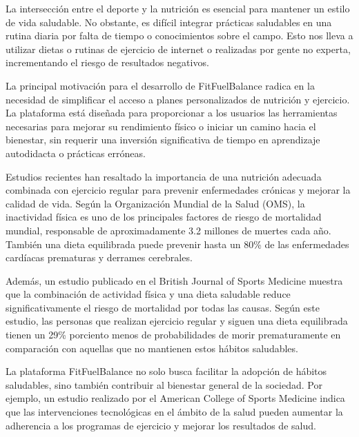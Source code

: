 La intersección entre el deporte y la nutrición es esencial para mantener un estilo de vida saludable. No obstante, es difícil integrar prácticas saludables en una rutina diaria por falta de tiempo o conocimientos sobre el campo. Esto nos lleva a utilizar dietas o rutinas de ejercicio de internet o realizadas por gente no experta, incrementando el riesgo de resultados negativos.

La principal motivación para el desarrollo de FitFuelBalance radica en la necesidad de simplificar el acceso a planes personalizados de nutrición y ejercicio. La plataforma está diseñada para proporcionar a los usuarios las herramientas necesarias para mejorar su rendimiento físico o iniciar un camino hacia el bienestar, sin requerir una inversión significativa de tiempo en aprendizaje autodidacta o prácticas erróneas.

Estudios recientes han resaltado la importancia de una nutrición adecuada combinada con ejercicio regular para prevenir enfermedades crónicas y mejorar la calidad de vida. Según la Organización Mundial de la Salud (OMS), la inactividad física es uno de los principales factores de riesgo de mortalidad mundial, responsable de aproximadamente 3.2 millones de muertes cada año\cite{WHOPhysicalActivity}. También una dieta equilibrada puede prevenir hasta un 80\% de las enfermedades cardíacas prematuras y derrames cerebrales\cite{CDC}.

Además, un estudio publicado en el British Journal of Sports Medicine muestra que la combinación de actividad física y una dieta saludable reduce significativamente el riesgo de mortalidad por todas las causas. Según este estudio, las personas que realizan ejercicio regular y siguen una dieta equilibrada tienen un 29\% porciento menos de probabilidades de morir prematuramente en comparación con aquellas que no mantienen estos hábitos saludables\cite{BJSM}.

La plataforma FitFuelBalance no solo busca facilitar la adopción de hábitos saludables, sino también contribuir al bienestar general de la sociedad. Por ejemplo, un estudio realizado por el American College of Sports Medicine indica que las intervenciones tecnológicas en el ámbito de la salud pueden aumentar la adherencia a los programas de ejercicio y mejorar los resultados de salud\cite{ACSMRebrandX}.